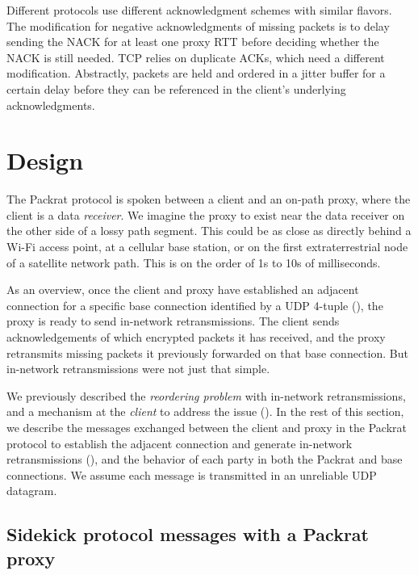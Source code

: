 Different protocols use different acknowledgment schemes with similar flavors.
The modification for negative acknowledgments of missing packets is to delay
sending the NACK for at least one proxy RTT before deciding whether the NACK is
still needed. TCP relies on duplicate ACKs, which need a different
modification. Abstractly, packets are held and ordered in a jitter buffer for a
certain delay before they can be referenced in the client's underlying
acknowledgments.

\section{Design}
\label{sec:packrat:design}

The Packrat protocol is spoken between a client and an on-path proxy, where the
client is a data \textit{receiver}. We imagine the proxy to exist near the data
receiver on the other side of a lossy path segment. This could be as close as
directly behind a Wi-Fi access point, at a cellular base station, or on the
first extraterrestrial node of a satellite network path. This is on the order
of 1s to 10s of milliseconds.

As an overview, once the client and proxy have established an adjacent
connection for a specific base connection identified by a UDP 4-tuple
(), the
proxy is ready to send in-network retransmissions. The client sends
acknowledgements of which encrypted packets it has received, and the proxy retransmits missing
packets it previously forwarded on that base connection.
But in-network retransmissions were not just that simple.

We previously described the \textit{reordering problem} with in-network
retransmissions, and a mechanism at the \textit{client} to address the issue
().
In the rest of this section, we describe the messages exchanged between the
client and proxy in the Packrat protocol to establish the adjacent connection
and generate in-network retransmissions (),
and the behavior of each party in both the Packrat and base
connections. We assume each message is transmitted in an unreliable UDP
datagram.

\subsection{Sidekick protocol messages with a Packrat proxy}
\label{sec:packrat:design:messages}

